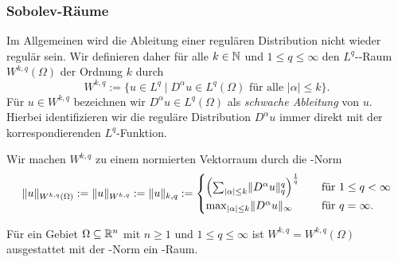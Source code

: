 \subsubsection{Sobolev-Räume}

Im Allgemeinen wird die Ableitung einer regulären Distribution nicht wieder regulär sein.
Wir definieren daher für alle $k \in \mathbb{N}$ und $1 \leq q \leq \infty$ den $L^q$\hyp{}\sobolev\hyp{}Raum $W^{k,q}(\Omega)$ der Ordnung $k$ durch
$$
W^{k,q} := \{ u \in L^q \mid D^\alpha u \in L^q(\Omega) \text{ für alle } |\alpha| \leq k\}.
$$
Für $u \in W^{k,q}$ bezeichnen wir $D^\alpha u \in L^q(\Omega)$ als \emph{schwache Ableitung} von $u$.
Hierbei identifizieren wir die reguläre Distribution $D^\alpha u$ immer direkt mit der korrespondierenden $L^q$\hyp{}Funktion.

Wir machen $W^{k,q}$ zu einem normierten Vektorraum durch die \sobolev\hyp{}Norm
$$
  \lVert u \rVert_{W^{k,q}(\Omega)} 
  := \lVert u \rVert_{W^{k,q}} 
  := \lVert u \rVert_{k,q} 
  := \begin{cases} 
    \left(\sum_{|\alpha| \leq k} \lVert D^\alpha u \rVert_q^q \right)^\frac{1}{q}\quad&\text{für } 1 \leq q < \infty \\
    \max_{|\alpha| \leq k} \lVert D^\alpha u \rVert_\infty \quad&\text{für }q = \infty.
    \end{cases}
$$

\begin{lem}
  Für ein Gebiet $\Omega \subseteq \mathbb{R}^n$ mit $n \geq 1$ und $1 \leq q \leq \infty$ ist $W^{k,q} = W^{k,q}(\Omega)$ ausgestattet mit der \sobolev\hyp{}Norm ein \banach\hyp{}Raum.
\end{lem}

